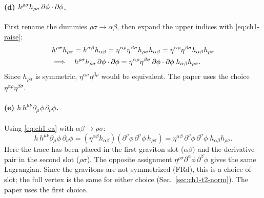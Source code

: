 \paragraph{(d) $h^{\rho\sigma}h_{\rho\sigma}\,\partial\phi\cdot\partial\phi$.} First rename the
dummies $\rho\sigma\to\alpha\beta$, then expand the upper indices with
\eqref{eq:ch1-raise}:
\begin{equation}
\begin{aligned}
&h^{\rho\sigma}h_{\rho\sigma}=h^{\alpha\beta}h_{\alpha\beta}=\eta^{\alpha\rho}\eta^{\beta\sigma}h_{\rho\sigma}h_{\alpha\beta}=\eta^{\alpha\rho}\eta^{\beta\sigma}h_{\alpha\beta}h_{\rho\sigma}\\
&\Longrightarrow\quad h^{\rho\sigma}h_{\rho\sigma}\,\partial\phi\cdot\partial\phi=\eta^{\alpha\rho}\eta^{\beta\sigma}\,\partial\phi\cdot\partial\phi\;h_{\alpha\beta}h_{\rho\sigma}.
\end{aligned}
\label{eq:ch1-cd}
\end{equation}
Since $h_{\rho\sigma}$ is symmetric, $\eta^{\alpha\sigma}\eta^{\beta\rho}$ would be
equivalent. The paper uses the choice $\eta^{\alpha\rho}\eta^{\beta\sigma}$.

\paragraph{(e) $h\,h^{\mu\nu}\partial_\mu\phi\,\partial_\nu\phi$.} Using
\eqref{eq:ch1-ca} with $\alpha\beta\to\rho\sigma$:
\begin{equation}
h\,h^{\mu\nu}\partial_\mu\phi\,\partial_\nu\phi=(\eta^{\alpha\beta}h_{\alpha\beta})(\partial^\rho\phi\,\partial^\sigma\phi\,h_{\rho\sigma})=\eta^{\alpha\beta}\,\partial^\rho\phi\,\partial^\sigma\phi\;h_{\alpha\beta}h_{\rho\sigma}.
\label{eq:ch1-ce}
\end{equation}
Here the trace has been placed in the first graviton slot ($\alpha\beta$) and the
derivative pair in the second slot ($\rho\sigma$). The opposite assignment
$\eta^{\rho\sigma}\partial^\alpha\phi\,\partial^\beta\phi$ gives the same
Lagrangian. Since the gravitons are not symmetrized (FRd), this is a choice of
slot; the full vertex is the same for either choice
(Sec.~\ref{sec:ch1-t2-norm}). The paper uses the first choice.

